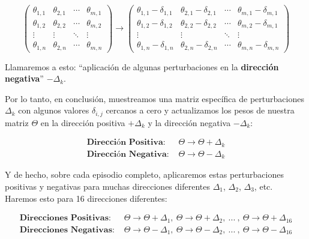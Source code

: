 \documentclass[]{book}
\begin{document}
\[
\begin{pmatrix}
\theta_{1,1} & \theta_{2,1} & \cdots & \theta_{m,1} \\
\theta_{1,2} & \theta_{2,2} & \cdots & \theta_{m,2} \\
\vdots & \vdots & \ddots & \vdots \\
\theta_{1,n} & \theta_{2,n} & \cdots & \theta_{m,n}
\end{pmatrix}
\longrightarrow
\begin{pmatrix}
\theta_{1,1} - \delta_{1,1} & \theta_{2,1} - \delta_{2,1} & \cdots & \theta_{m,1} - \delta_{m,1} \\
\theta_{1,2} - \delta_{1,2} & \theta_{2,2} - \delta_{2,2} & \cdots & \theta_{m,2} - \delta_{m,1} \\
\vdots & \vdots & \ddots & \vdots \\
\theta_{1,n} - \delta_{1,n} & \theta_{2,n} - \delta_{2,n} & \cdots & \theta_{m,n} - \delta_{m,n}
\end{pmatrix}
\]

Llamaremos a esto: ``aplicación de algunas perturbaciones en la \textbf{dirección negativa}'' \(-\Delta_k\).

Por lo tanto, en conclusión, muestreamos una matriz específica de perturbaciones \(\Delta_k\) con algunos valores \(\delta_{i, j}\) cercanos a cero y actualizamos los pesos de nuestra matriz \(\Theta\) en la dirección positiva \(+\Delta_k\) y la dirección negativa \(-\Delta_k\):

\begin{align*}
\textbf{Dirección Positiva: } & \Theta \rightarrow \Theta + \Delta_k \\
\textbf{Dirección Negativa: } & \Theta \rightarrow \Theta - \Delta_k
\end{align*}

Y de hecho, sobre cada episodio completo, aplicaremos estas perturbaciones positivas y negativas para muchas direcciones diferentes \(\Delta_1\), \(\Delta_2\), \(\Delta_3\), etc. Haremos esto para 16 direcciones diferentes:

\begin{align*}
\textbf{Direcciones Positivas: } & \Theta \rightarrow \Theta + \Delta_1, \ \Theta \rightarrow \Theta + \Delta_2, \ ... \ , \ \Theta \rightarrow \Theta + \Delta_{16} \\
\textbf{Direcciones Negativas: } & \Theta \rightarrow \Theta - \Delta_1, \ \Theta \rightarrow \Theta - \Delta_2, \ ... \ , \ \Theta \rightarrow \Theta - \Delta_{16}
\end{align*}
\end{document}
